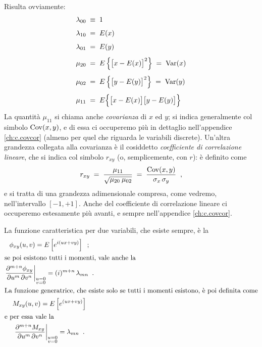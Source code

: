 Risulta ovviamente:
\begin{align*}
  \lambda_{00} \; &\equiv \; 1 \\[1ex]
  \lambda_{10} \; &= \; E(x) \\[1ex]
  \lambda_{01} \; &= \; E(y) \\[1ex]
  \mu_{20} \; &= \; E \left\{ \bigl[ x - E(x) \bigr]^2
  \right\} \; = \; \operatorname{Var} (x) \\[1ex]
  \mu_{02} \; &= \; E \left\{ \bigl[ y - E(y) \bigr]^2
  \right\} \; = \; \operatorname{Var} (y) \\[1ex]
  \mu_{11} \; &= \; E \Bigl\{ \bigl[ x - E(x) \bigr] \bigl[
    y - E(y) \bigr] \Bigr\}
\end{align*}
La quantit\`a $\mu_{11}$ si chiama anche \emph{covarianza}%
di $x$ ed $y$; si indica generalmente col simbolo
$\operatorname{Cov}(x,y)$, e di essa ci occuperemo pi\`u in dettaglio
nell'appendice \ref{ch:c.covcor} (almeno per quel che
riguarda le variabili discrete).  Un'altra grandezza
collegata alla covarianza \`e il cosiddetto
\emph{coefficiente di correlazione lineare},%
che si indica col simbolo $r_{xy}$ (o, semplicemente, con
$r$): \`e definito come
\begin{equation*}
  r_{xy} \; = \; \frac{ \mu_{11} }{ \sqrt{\mu_{20} \:
      \mu_{02}} } \; = \; \frac{ \operatorname{Cov}(x,y) }{ \sigma_x \,
    \sigma_y } \;\; ,
\end{equation*}
e si tratta di una grandezza adimensionale compresa, come
vedremo, nell'intervallo $[ -1, +1 ]$.  Anche del
coefficiente di correlazione lineare ci occuperemo
estesamente pi\`u avanti, e sempre nell'appendice
\ref{ch:c.covcor}.

La funzione caratteristica per due variabili,%
che esiste sempre, \`e la
\begin{gather*}
  \phi_{xy} (u,v) = E \left[ e^{ i (ux+vy) } \right] \peq ;
  \\
  \intertext{se poi esistono tutti i momenti, vale anche la}
  \left. \frac{ \partial^{m+n} \phi_{xy} }{ \partial u^m \,
      \partial v^n } \right|_{\substack{u=0\\ v=0}} =
  (i)^{ m+n } \, \lambda_{mn} \peq . \\
  \intertext{La funzione generatrice,%
    \index{funzione!generatrice dei momenti}
    che esiste solo se tutti i momenti esistono, \`e poi
    definita come}
  M_{xy} (u,v) = E \left[ e^{ ( ux + vy ) } \right] \\
  \intertext{e per essa vale la}
  \left. \frac{ \partial^{m+n} M_{xy} }{ \partial u^m \,
      \partial v^n } \right|_{\substack{u=0\\ v=0}} =
  \lambda_{mn} \peq .
\end{gather*}

